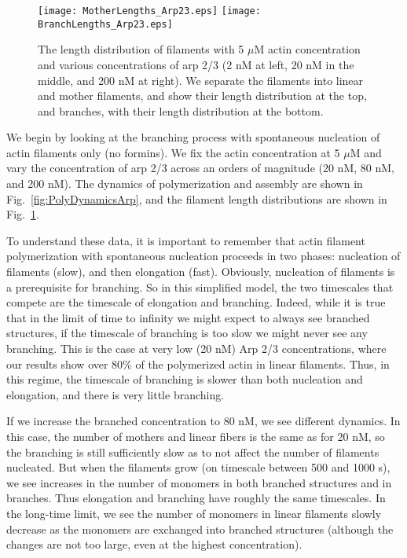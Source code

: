 \documentclass[11pt]{article}
\begin{document}
\begin{figure}
\centering
\texttt{[image: MotherLengths\_Arp23.eps]}
\texttt{[image: BranchLengths\_Arp23.eps]}
\caption{\label{fig:LengthDistsArp} The length distribution of filaments with 5 $\mu$M actin concentration and various concentrations of arp 2/3 (2 nM at left, 20 nM in the middle, and 200 nM at right). We separate the filaments into linear and mother filaments, and show their length distribution at the top, and branches, with their length distribution at the bottom. }
\end{figure}

We begin by looking at the branching process with spontaneous nucleation of actin filaments only (no formins). We fix the actin concentration at 5 $\mu$M and vary the concentration of arp 2/3 across an orders of magnitude (20 nM, 80 nM, and 200 nM). The dynamics of polymerization and assembly are shown in Fig.\ \ref{fig:PolyDynamicsArp}, and the filament length distributions are shown in Fig.\ \ref{fig:LengthDistsArp}. 

To understand these data, it is important to remember that actin filament polymerization with spontaneous nucleation proceeds in two phases: nucleation of filaments (slow), and then elongation (fast). Obviously, nucleation of filaments is a prerequisite for branching. So in this simplified model, the two timescales that compete are the timescale of elongation and branching. Indeed, while it is true that in the limit of time to infinity we might expect to always see branched structures, if the timescale of branching is too slow we might never see any branching. This is the case at very low (20 nM) Arp 2/3 concentrations, where our results show over 80\% of the polymerized actin in linear filaments. Thus, in this regime, the timescale of branching is slower than both nucleation and elongation, and there is very little branching. 

If we increase the branched concentration to 80 nM, we see different dynamics. In this case, the number of mothers and linear fibers is the same as for 20 nM, so the branching is still sufficiently slow as to not affect the number of filaments nucleated. But when the filaments grow (on timescale between 500 and 1000 s), we see increases in the number of monomers in both branched structures and in branches. Thus elongation and branching have roughly the same timescales. In the long-time limit, we see the number of monomers in linear filaments slowly decrease as the monomers are exchanged into branched structures (although the changes are not too large, even at the highest concentration).
\end{document}
